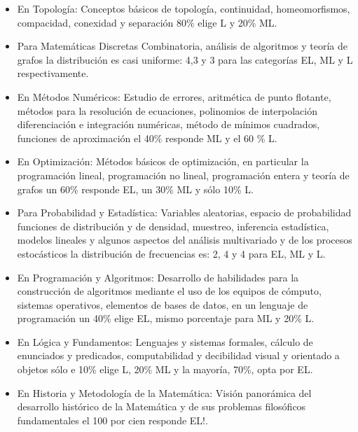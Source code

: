 \documentclass[a4paper,10pt,BCOR10mm,oneside,headsepline]{scrbook}
\begin{document}
\begin{itemize}
\item En Topología: Conceptos básicos de topología, continuidad, homeomorfismos, compacidad, conexidad y separación 80\% elige L y 20\% ML.

\item Para Matemáticas Discretas Combinatoria, análisis de algoritmos y teoría de grafos la distribución es casi uniforme: 4,3 y 3 para las categorías EL, ML y L respectivamente.

\item En Métodos Numéricos: Estudio de errores, aritmética de punto flotante, métodos para la resolución de ecuaciones, polinomios de interpolación diferenciación e integración numéricas, método de mínimos cuadrados, funciones de aproximación el 40\% responde ML y el 60 \% L.

\item En Optimización: Métodos básicos de optimización, en particular la programación lineal, programación no lineal, programación entera y teoría de grafos un 60\% responde EL, un 30\% ML y sólo 10\% L.

\item Para Probabilidad y Estadística: Variables aleatorias, espacio de probabilidad funciones de distribución y de densidad, muestreo, inferencia estadística, modelos lineales y algunos aspectos del análisis multivariado y de los procesos estocásticos la distribución de frecuencias es: 2, 4 y 4 para EL, ML y L.

\item En Programación y Algoritmos: Desarrollo de habilidades para la construcción de algoritmos mediante el uso de los equipos de cómputo, sistemas operativos, elementos de bases de datos, en un lenguaje de programación un 40\% elige EL, mismo porcentaje para ML y 20\% L.

\item En Lógica y Fundamentos: Lenguajes y sistemas formales, cálculo de enunciados y predicados, computabilidad y decibilidad visual y orientado a objetos sólo e 10\% elige L, 20\% ML y la mayoría, 70\%, opta por EL.

\item En Historia y Metodología de la Matemática: Visión panorámica del desarrollo histórico de la Matemática y de sus problemas filosóficos fundamentales el 100 por cien responde EL!.

\end{itemize}
\end{document}
